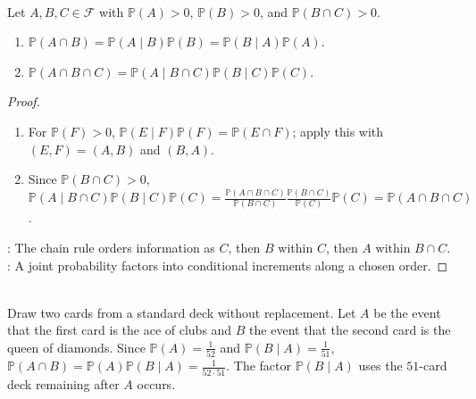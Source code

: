 \begin{proposition} \label{prop:multiplication-and-chain-rules} \\
Let $A,B,C\in\mathcal{F}$ with $\mathbb{P}(A)>0$, $\mathbb{P}(B)>0$, and $\mathbb{P}(B\cap C)>0$.
\begin{enumerate}[label=(\roman*)]
\setlength{\itemsep}{0pt}
\item $\mathbb{P}(A\cap B)=\mathbb{P}(A\mid B)\mathbb{P}(B)=\mathbb{P}(B\mid A)\mathbb{P}(A)$.
\item $\mathbb{P}(A\cap B\cap C)=\mathbb{P}(A\mid B\cap C)\mathbb{P}(B\mid C)\mathbb{P}(C)$.
\end{enumerate}
\begin{proof}
\begin{enumerate}[label=(\roman*)]
\setlength{\itemsep}{0pt}
\item For $\mathbb{P}(F)>0$, $\mathbb{P}(E\mid F)\mathbb{P}(F)=\mathbb{P}(E\cap F)$; apply this with $(E,F)=(A,B)$ and $(B,A)$.
\item Since $\mathbb{P}(B\cap C)>0$, $\mathbb{P}(A\mid B\cap C)\mathbb{P}(B\mid C)\mathbb{P}(C)=\frac{\mathbb{P}(A\cap B\cap C)}{\mathbb{P}(B\cap C)}\frac{\mathbb{P}(B\cap C)}{\mathbb{P}(C)}\mathbb{P}(C)=\mathbb{P}(A\cap B\cap C)$.
\end{enumerate}
: The chain rule orders information as $C$, then $B$ within $C$, then $A$ within $B\cap C$.\\
: A joint probability factors into conditional increments along a chosen order.
\end{proof}
\end{proposition}

\begin{example} \label{ex:cards-without-replacement-multiplication-rule} \\
Draw two cards from a standard deck without replacement. Let $A$ be the event that the first card is the ace of clubs and $B$ the event that the second card is the queen of diamonds. Since $\mathbb{P}(A)=\frac{1}{52}$ and $\mathbb{P}(B\mid A)=\frac{1}{51}$, $\mathbb{P}(A\cap B)=\mathbb{P}(A)\mathbb{P}(B\mid A)=\frac{1}{52\cdot51}$.
The factor $\mathbb{P}(B\mid A)$ uses the $51$-card deck remaining after $A$ occurs.
\end{example}

